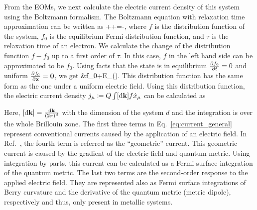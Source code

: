 \documentclass[aps,prb,longbibliography,superscriptaddress,twocolumn]{revtex4-2}
\def\be#1\ee{\begin{align}#1\end{align}}
\begin{document}
From the EOMs, we next calculate the electric current density of this system using the Boltzmann formalism. The Boltzmann equation with relaxation time approximation can be written as
\be
    \pdv{f}{t}+\cdot{}+\cdot{}=-,
\ee
where $f$ is the distribution function of the system, $f_0$ is the equilibrium Fermi distribution function, and $\tau$ is the relaxation time of an electron. We calculate the change of the distribution function $f-f_0$ up to a first order of $\tau$. In this case, $f$ in the left hand side can be approximated to be $f_0$. Using facts that the state is in equilibrium $\pdv{f_0}{t}=0$ and uniform $\pdv{f_0}{\vb{x}}=\vb{0}$, we get
\be
    f&\approx f_0+E_{\mu}().
\ee
This distribution function has the same form as the one under a uniform electric field. Using this distribution function, the electric current density $j_{\mu}\coloneqq Q\int[\mathrm{d}\vb{k}]f\dot{x}_{\mu}$ can be calculated as
Here, $\qty[\mathrm{d}\vb{k}] = \frac{\mathrm{d}\vb{k}}{(2\pi)^d}$ with the dimension of the system $d$ and the integration is over the whole Brillouin zone. The first three terms in Eq.~\eqref{eq:current_general} represent conventional currents caused by the application of an electric field. In Ref.~\cite{Lapa_Hughes_2019}, the fourth term is referred as the ``geometric'' current. This geometric current is caused by the gradient of the electric field and quantum metric. Using integration by parts, this current can be calculated as a Fermi surface integration of the quantum metric. The last two terms are the second-order response to the applied electric field. They are represented also as Fermi surface integrations of Berry curvature and the derivative of the quantum metric (metric dipole), respectively and thus, only present in metallic systems.
\end{document}
